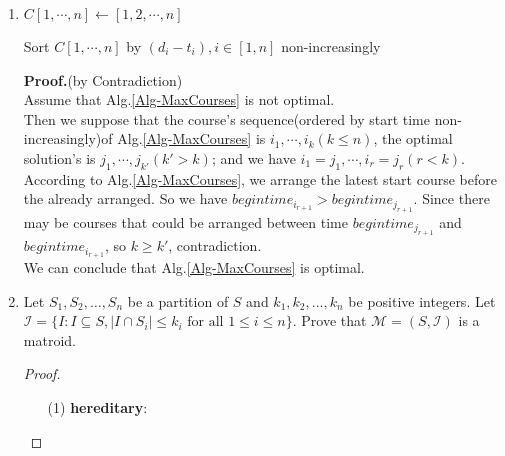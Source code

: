 \documentclass[12pt,a4paper]{article}
\makeatletter
\newtheorem*{solution}{Solution}
\theoremstyle{definition}
\renewenvironment{solution}[1][Solution] {\par\pushQED{\qed}\normalfont\topsep6\p@\@plus6\p@\relax\trivlist\item[\hskip\labelsep\bfseries#1\@addpunct{.}]\ignorespaces}{\popQED\endtrivlist\@endpefalse} \makeatother
\makeatother
\begin{document}
\begin{enumerate}
\begin{solution}
\begin{minipage}[t]{0.90\textwidth}
\begin{algorithm}[H]
        		$C[1,\cdots,n] \leftarrow [1,2,\cdots,n]$\;
        		
        		Sort $C[1,\cdots,n]$ by $ (d_i - t_i),i\in[1,n]$ non-increasingly\;
        		
        		
        		
        		
        	
        		\;
        	\end{algorithm}
        \end{minipage}
    
    	\textbf{Proof.}(by Contradiction)\\
    	Assume that Alg.\ref{Alg-MaxCourses} is not optimal.\\
    	Then we suppose that the course's sequence(ordered by start time non-increasingly)of Alg.\ref{Alg-MaxCourses} is $ i_1,\cdots,i_k(k\leq n) $, the optimal solution's is $ j_1,\cdots,j_{k'}(k'>k)$; and we have $ i_1 = j_1,\cdots,i_r = j_r(r < k)$.\\
    	According to Alg.\ref{Alg-MaxCourses}, we arrange the latest start course before the already arranged. So we have $ begintime_{i_{r+1}} > begintime_{j_{r+1}} $. Since there may be courses that could be arranged between time $ begintime_{j_{r+1}} $ and $ begintime_{i_{r+1}} $, so $ k \geq k'$, contradiction.\\
    	We can conclude that Alg.\ref{Alg-MaxCourses} is optimal.
    \end{solution}

    \item
    Let $S_1,S_2,\dots,S_n$ be a partition of $S$ and $k_1,k_2,\dots,k_n$ be positive integers. Let $\mathcal{I}=\{I: I \subseteq S,|I \cap S_i| \leq k_i \text { for all } 1 \leq i \leq n\}$. Prove that $\mathcal{M}=(S,\mathcal{I})$ is a matroid.

    \begin{proof}\hspace*{\fill}
        \begin{enumerate}
        	\item[(1)] \textbf{hereditary}:
        	

\end{enumerate}
\end{proof}
\end{enumerate}
\end{document}
